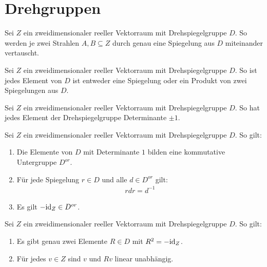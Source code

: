\documentclass{report}
\begin{document}

\tableofcontents
\chapter{Drehgruppen}


\begin{lemma}
	Sei $Z$ ein zweidimensionaler reeller Vektorraum mit Drehspiegelgruppe $D$. So werden je zwei Strahlen $A, B \subseteq Z$ durch genau eine Spiegelung aus $D$ miteinander vertauscht.
\end{lemma}
\begin{lemma}
	Sei $Z$ ein zweidimensionaler reeller Vektorraum mit Drehspiegelgruppe $D$.
	So ist jedes Element von $D$ ist entweder eine Spiegelung oder ein Produkt von zwei Spiegelungen aus $D$.
\end{lemma}
\begin{lemma}
	Sei $Z$ ein zweidimensionaler reeller Vektorraum mit Drehspiegelgruppe $D$. So hat jedes Element der Drehspiegelgruppe Determinante $\pm 1$.
\end{lemma}
\begin{lemma}
	Sei $Z$ ein zweidimensionaler reeller Vektorraum mit Drehspiegelgruppe $D$. So gilt: 
	\begin{enumerate}
		\item Die Elemente von $D$ mit Determinante $1$ bilden eine kommutative Untergruppe $D^{or}$.
		\item Für jede Spiegelung $r \in D$ und alle $d \in D^{or}$ gilt:
		\begin{align*}
			rdr = d^{-1}
		\end{align*}
		\item Es gilt $-\textnormal{id}_Z \in D^{or}$.
	\end{enumerate}
\end{lemma}
\begin{lemma}
	Sei $Z$ ein zweidimensionaler reeller Vektorraum mit Drehspiegelgruppe $D$. So gilt:
	\begin{enumerate}
		\item Es gibt genau zwei Elemente $R \in D$ mit $R^2 = -\textnormal{id}_Z$. 
		\item Für jedes $v \in Z$ sind $v$ und $Rv$ linear unabhängig.
	\end{enumerate} 
\end{lemma}
\end{document}
